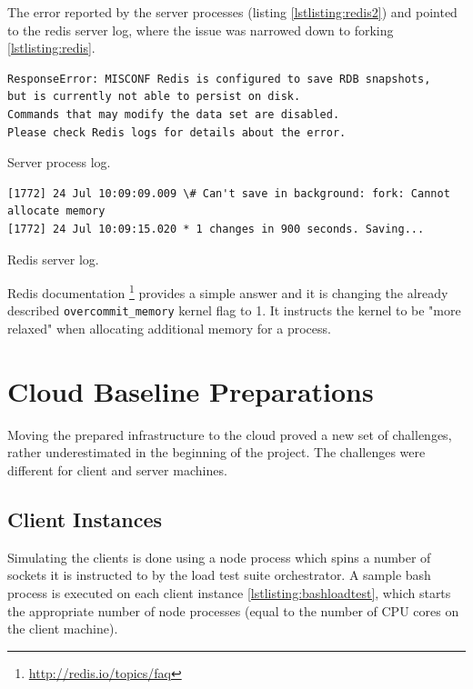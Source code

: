 \documentclass{uvamscse}
\begin{document}
The error reported by the server processes (listing \ref{lstlisting:redis2}) and pointed to the redis server log, where the issue was narrowed down to forking \ref{lstlisting:redis}.

\begin{sourcecode}[h]
\begin{lstlisting}[style=mono]
ResponseError: MISCONF Redis is configured to save RDB snapshots,
but is currently not able to persist on disk.
Commands that may modify the data set are disabled.
Please check Redis logs for details about the error.
\end{lstlisting}
\caption{Server process log.}
\label{lstlisting:redis2}
\end{sourcecode}

\begin{sourcecode}[h]
\begin{lstlisting}[style=mono]
[1772] 24 Jul 10:09:09.009 \# Can't save in background: fork: Cannot allocate memory
[1772] 24 Jul 10:09:15.020 * 1 changes in 900 seconds. Saving...
\end{lstlisting}
\caption{Redis server log.}
\label{lstlisting:redis}
\end{sourcecode}

Redis documentation \footnote{\url{http://redis.io/topics/faq}} provides a simple answer and it is changing the already described \texttt{overcommit\_memory} kernel flag to 1. It instructs the kernel to be "more relaxed" when allocating additional memory for a process.

\section{Cloud Baseline Preparations}\label{Cloud baseline preparations}
Moving the prepared infrastructure to the cloud proved a new set of challenges, rather underestimated in the beginning of the project. The challenges were different for client and server machines.

\subsection{Client Instances}
Simulating the clients is done using a node process which spins a number of sockets it is instructed to by the load test suite orchestrator. A sample bash process is executed on each client instance \ref{lstlisting:bashloadtest}, which starts the appropriate number of node processes (equal to the number of CPU cores on the client machine).
\end{document}
